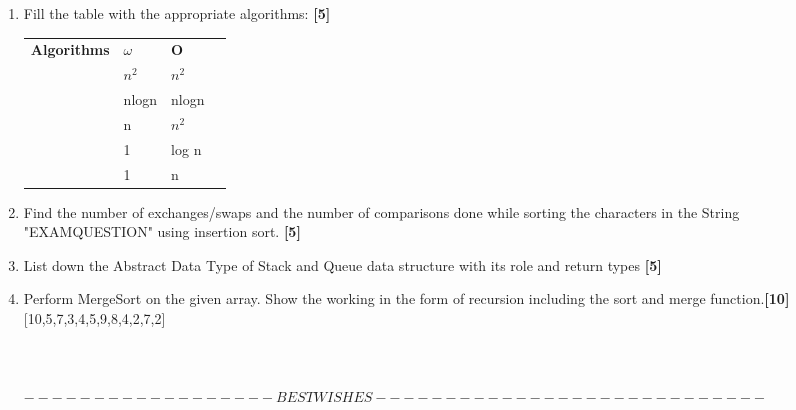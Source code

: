 \documentclass[12pt ,a4paper]{exam}
\begin{document}
	\begin{enumerate}[start=1,label={\bfseries Q\arabic*)}]
		\item Fill the table with the appropriate algorithms: \hfill \textbf{ [5]}
		
		\begin{table}[h]
			\centering
			\begin{tabular}{|l|l|l|l}
				\cline{1-3}
				\textbf{Algorithms} & \textbf{$\omega$} & \textbf{O}  &  \\ \cline{1-3}
				  &  $n^2$ &    $n^2$  &  \\ \cline{1-3}
				  &  nlogn &  nlogn   &  \\ \cline{1-3}
				  &  n &   $n^2$   &  \\ \cline{1-3}
				  &   1 & log n    &  \\ \cline{1-3}
				  &  1 &  n   &  \\ \cline{1-3}
			\end{tabular}
	\end{table}
	\item Find the number of exchanges/swaps and the number of comparisons done while sorting the characters in the String "EXAMQUESTION" using insertion sort.  \hfill\textbf{[5]} 
	\item List down the Abstract Data Type of Stack and Queue data structure with its role and return types \hfill\textbf{[5]} 
	\item Perform MergeSort on the given array. Show the working in the form of recursion including the sort and merge function.\hfill\textbf{[10]} 
	\\{[10,5,7,3,4,5,9,8,4,2,7,2]}
	\\
	\\
	\\
	\\
	$------------ ------BEST WISHES----------------------------$
	\end{enumerate}
	
\end{document}
